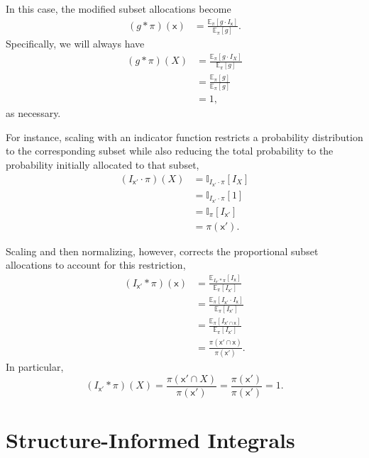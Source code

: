 \documentclass[
  letterpaper,
  DIV=11,
  numbers=noendperiod]{scrartcl}
\begin{document}
In this case, the modified subset allocations become \begin{align*}
(g \ast \pi)(\mathsf{x})
&=
\frac{ \mathbb{E}_{\pi} [ g \cdot I_{\mathsf{x}} ] }
{ \mathbb{E}_{\pi} [ g ] }.
\end{align*} Specifically, we will always have \begin{align*}
(g \ast \pi)(X)
&=
\frac{ \mathbb{E}_{\pi} [ g \cdot I_{X} ] }
{ \mathbb{E}_{\pi} [ g ] }
\\
&=
\frac{ \mathbb{E}_{\pi} [ g ] }
{ \mathbb{E}_{\pi} [ g ] }
\\
&=
1,
\end{align*} as necessary.

For instance, scaling with an indicator function restricts a probability
distribution to the corresponding subset while also reducing the total
probability to the probability initially allocated to that subset,
\begin{align*}
(I_{\mathsf{x}'} \cdot \pi)(X)
&=
\mathbb{I}_{I_{\mathsf{x}'} \cdot \pi} [ I_{X} ]
\\
&=
\mathbb{I}_{I_{\mathsf{x}'} \cdot \pi} [ 1 ]
\\
&=
\mathbb{I}_{\pi} [ I_{\mathsf{x}'} ]
\\
&=
\pi(\mathsf{x}').
\end{align*}

Scaling and then normalizing, however, corrects the proportional subset
allocations to account for this restriction, \begin{align*}
(I_{\mathsf{x}'} \ast \pi)( \mathsf{x} )
&=
\frac{ \mathbb{E}_{I_{\mathsf{x}'} \ast \pi} [ I_{\mathsf{x}} ] }
{ \mathbb{E}_{\pi} [ I_{\mathsf{x}'} ] }
\\
&=
\frac{ \mathbb{E}_{\pi} [ I_{\mathsf{x}'} \cdot I_{\mathsf{x}} ] }
{ \mathbb{E}_{\pi} [ I_{\mathsf{x}'} ] }
\\
&=
\frac{ \mathbb{E}_{\pi} [ I_{\mathsf{x}' \cap \mathsf{x}} ] }
{ \mathbb{E}_{\pi} [ I_{\mathsf{x}'} ] }
\\
&=
\frac{ \pi(\mathsf{x}' \cap \mathsf{x}) }
{ \pi(\mathsf{x}') }.
\end{align*} In particular, \[
(I_{\mathsf{x}'} \ast \pi)( X )
=
\frac{ \pi(\mathsf{x}' \cap X) }{ \pi(\mathsf{x}') }
=
\frac{ \pi(\mathsf{x}') }{ \pi(\mathsf{x}') }
=
1.
\]

\section{Structure-Informed
Integrals}\label{structure-informed-integrals}
\end{document}
